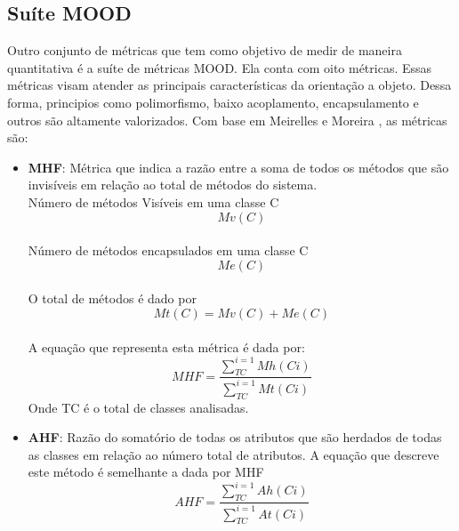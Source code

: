 \subsection{Suíte MOOD}
Outro conjunto de métricas que tem como objetivo de medir de maneira quantitativa é a suíte de métricas MOOD. Ela conta com oito métricas. Essas métricas visam atender as principais características da orientação a objeto. Dessa forma, principios como polimorfismo, baixo acoplamento, encapsulamento e outros são altamente valorizados. Com base em Meirelles \cite{paulo_meirelles} e Moreira \cite{moreira_avaliacao_2015}, as métricas são:
\begin{itemize}
\item \textbf{MHF}: Métrica que indica a razão entre a soma de todos os métodos que são invisíveis em relação ao total de métodos do sistema.
\\Número de métodos Visíveis em uma classe C
\begin{equation}
Mv(C)
\end{equation}
\\Número de métodos encapsulados em uma classe C
\begin{equation}
Me(C)
\end{equation}
\\O total de métodos é dado por
\begin{equation}
Mt(C) = Mv(C)+Me(C)
\end{equation}
\\A equação que representa esta métrica é dada por:
\begin{equation}
MHF =\frac{\sum_{TC}^{i=1}Mh(Ci)}{\sum_{TC}^{i=1}Mt(Ci)}
\end{equation}
Onde TC é o total de classes analisadas.

\item \textbf{AHF}: Razão do somatório de todas os atributos que são herdados de todas as classes em relação ao número total de atributos. A equação que descreve este método é semelhante a dada por MHF
\begin{equation}
AHF =\frac{\sum_{TC}^{i=1}Ah(Ci)}{\sum_{TC}^{i=1}At(Ci)}
\end{equation}


\end{itemize}
